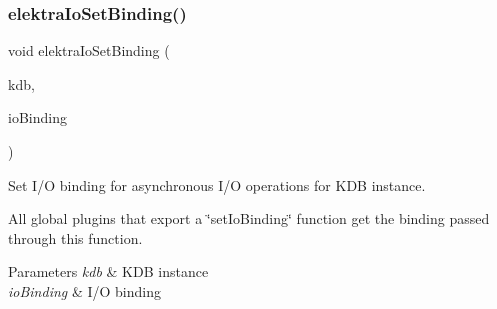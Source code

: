 \subsubsection{\texorpdfstring{elektra\+Io\+Set\+Binding()}{elektraIoSetBinding()}}
{\footnotesize\ttfamily void elektra\+Io\+Set\+Binding (\begin{DoxyParamCaption}\item[{K\+DB $\ast$}]{kdb,  }\item[{\hyperlink{kdbio_8h_aabcd87b8c09d4d4c1033fc1baa417391}{Elektra\+Io\+Interface} $\ast$}]{io\+Binding }\end{DoxyParamCaption})}



Set I/O binding for asynchronous I/O operations for K\+DB instance. 

All global plugins that export a \char`\"{}set\+Io\+Binding\char`\"{} function get the binding passed through this function.


\begin{DoxyParams}{Parameters}
{\em kdb} & K\+DB instance \\
\hline
{\em io\+Binding} & I/O binding \\
\hline
\end{DoxyParams}
